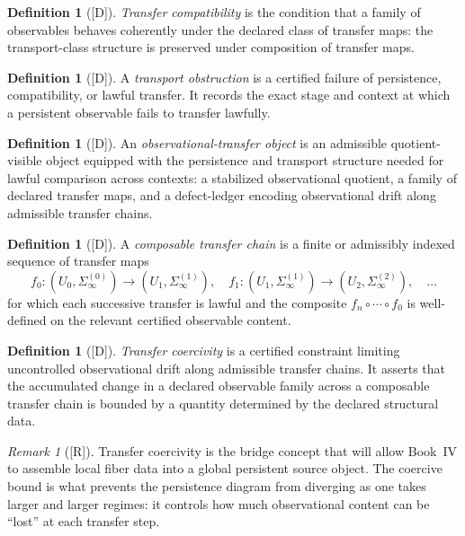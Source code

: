 \documentclass[12pt,oneside]{amsbook}
\theoremstyle{plain}
\theoremstyle{definition}
\newtheorem{definition}[theorem]{Definition}
\theoremstyle{remark}
\newtheorem{remark}[theorem]{Remark}
\newcommand{\status}[1]{\textup{[#1]}}
\begin{document}
\begin{definition}[\status{D}]\label{def:transfer-compatibility}
\emph{Transfer compatibility} is the condition that a family of
observables behaves coherently under the declared class of transfer
maps: the transport-class structure is preserved under composition of
transfer maps.
\end{definition}

\begin{definition}[\status{D}]\label{def:transport-obstruction}
A \emph{transport obstruction} is a certified failure of persistence,
compatibility, or lawful transfer.  It records the exact stage and
context at which a persistent observable fails to transfer lawfully.
\end{definition}

\begin{definition}[\status{D}]\label{def:OT-object}
An \emph{observational-transfer object} is an admissible
quotient-visible object equipped with the persistence and transport
structure needed for lawful comparison across contexts: a stabilized
observational quotient, a family of declared transfer maps, and a
defect-ledger encoding observational drift along admissible transfer
chains.
\end{definition}

\begin{definition}[\status{D}]\label{def:composable-chain}
A \emph{composable transfer chain} is a finite or admissibly indexed
sequence of transfer maps
\[
  f_0: (U_0, \Sigma^{(0)}_\infty) \to (U_1, \Sigma^{(1)}_\infty),
  \quad
  f_1: (U_1, \Sigma^{(1)}_\infty) \to (U_2, \Sigma^{(2)}_\infty),
  \quad \ldots
\]
for which each successive transfer is lawful and the composite
$f_{n} \circ \cdots \circ f_0$ is well-defined on the relevant
certified observable content.
\end{definition}

\begin{definition}[\status{D}]\label{def:transfer-coercivity}
\emph{Transfer coercivity} is a certified constraint limiting
uncontrolled observational drift along admissible transfer chains.  It
asserts that the accumulated change in a declared observable family
across a composable transfer chain is bounded by a quantity determined
by the declared structural data.
\end{definition}

\begin{remark}[\status{R}]\label{rmk:coercivity-source}
Transfer coercivity is the bridge concept that will allow Book~IV to
assemble local fiber data into a global persistent source object.  The
coercive bound is what prevents the persistence diagram from diverging
as one takes larger and larger regimes: it controls how much
observational content can be ``lost'' at each transfer step.
\end{remark}
\end{document}

